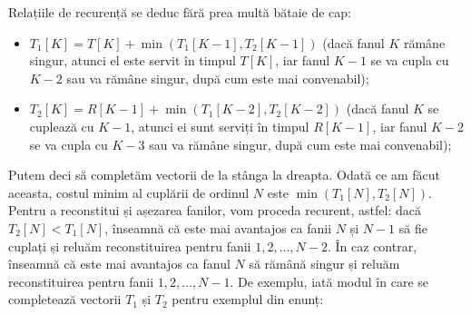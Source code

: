 Relațiile de recurență se deduc fără prea multă bătaie de cap:

\begin{itemize}

\item $T_1[K] = T[K] + \min(T_1[K-1], T_2[K-1])$ (dacă fanul $K$ rămâne
  singur, atunci el este servit în timpul $T[K]$, iar fanul $K-1$ se va cupla
  cu $K-2$ sau va rămâne singur, după cum este mai convenabil);

\item $T_2[K] = R[K-1] + \min(T_1[K-2], T_2[K-2])$ (dacă fanul $K$ se cuplează
  cu $K-1$, atunci ei sunt serviți în timpul $R[K-1]$, iar fanul $K-2$ se va
  cupla cu $K-3$ sau va rămâne singur, după cum este mai convenabil);

\end{itemize}

Putem deci să completăm vectorii de la stânga la dreapta. Odată ce am făcut
aceasta, costul minim al cuplării de ordinul $N$ este $\min(T_1[N],
T_2[N])$. Pentru a reconstitui și așezarea fanilor, vom proceda recurent,
astfel: dacă $T_2[N]<T_1[N]$, înseamnă că este mai avantajos ca fanii $N$ și
$N-1$ să fie cuplați și reluăm reconstituirea pentru fanii $1, 2, \dots,
N-2$. În caz contrar, înseamnă că este mai avantajos ca fanul $N$ să rămână
singur și reluăm reconstituirea pentru fanii $1, 2, \dots, N-1$. De exemplu,
iată modul în care se completează vectorii $T_1$ și $T_2$ pentru exemplul din
enunț:


